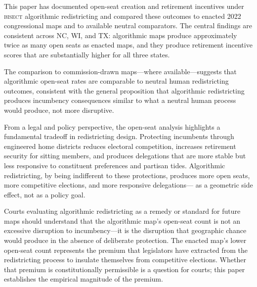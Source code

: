 \label{sec:conclusion}

This paper has documented open-seat creation and retirement incentives under \textsc{bisect}
algorithmic redistricting and compared these outcomes to enacted 2022 congressional maps
and to available neutral comparators. The central findings are consistent across NC, WI,
and TX: algorithmic maps produce approximately twice as many open seats as enacted maps,
and they produce retirement incentive scores that are substantially higher for all three
states.

The comparison to commission-drawn maps---where available---suggests that algorithmic
open-seat rates are comparable to neutral human redistricting outcomes, consistent with
the general proposition that algorithmic redistricting produces incumbency consequences
similar to what a neutral human process would produce, not more disruptive.

From a legal and policy perspective, the open-seat analysis highlights a fundamental
tradeoff in redistricting design. Protecting incumbents through engineered home districts
reduces electoral competition, increases retirement security for sitting members, and
produces delegations that are more stable but less responsive to constituent preferences
and partisan tides. Algorithmic redistricting, by being indifferent to these protections,
produces more open seats, more competitive elections, and more responsive delegations---
as a geometric side effect, not as a policy goal.

Courts evaluating algorithmic redistricting as a remedy or standard for future maps
should understand that the algorithmic map's open-seat count is not an excessive
disruption to incumbency---it is the disruption that geographic chance would produce
in the absence of deliberate protection. The enacted map's lower open-seat count
represents the premium that legislators have extracted from the redistricting process
to insulate themselves from competitive elections. Whether that premium is constitutionally
permissible is a question for courts; this paper establishes the empirical magnitude
of the premium.
